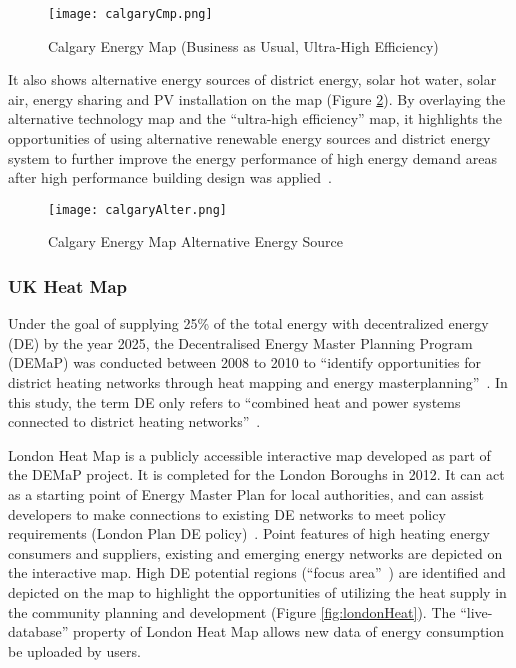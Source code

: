 \documentclass[hidelinks,12pt]{article}
\newcommand{\fref}[1]{Figure \ref{#1}}
\begin{document}
\begin{figure}[h!]
  \centering
  \texttt{[image: calgaryCmp.png]}
  \caption{Calgary Energy Map (Business as Usual, Ultra-High
    Efficiency)~\cite{aacip2009}}
  \label{fig:calgaryCmp}
\end{figure}

It also shows alternative energy sources of district energy, solar hot
water, solar air, energy sharing and PV installation on the map
(\fref{fig:calgaryAlter}). By overlaying the alternative technology
map and the ``ultra-high efficiency'' map, it highlights the
opportunities of using alternative renewable energy sources and
district energy system to further improve the energy performance of
high energy demand areas after high performance building design was
applied~\cite{aacip2009}.

\begin{figure}[h!]
  \centering
  \texttt{[image: calgaryAlter.png]}
  \caption{Calgary Energy Map Alternative Energy Source~\cite{aacip2009}}
  \label{fig:calgaryAlter}
\end{figure}

\subsubsection{UK Heat Map}
Under the goal of supplying 25\% of the total energy with
decentralized energy (DE) by the year 2025, the Decentralised Energy
Master Planning Program (DEMaP) was conducted between 2008 to 2010 to
``identify opportunities for district heating networks through heat
mapping and energy masterplanning''~\cite{londonHeatMap}. In this
study, the term DE only refers to ``combined heat and power systems
connected to district heating
networks''~\cite{decentralHeatMap2011}. 

London Heat Map is a publicly accessible interactive map developed as
part of the DEMaP project. It is completed for the London Boroughs in
2012. It can act as a starting point of Energy Master Plan for local
authorities, and can assist developers to make connections to existing
DE networks to meet policy requirements (London Plan DE
policy)~\cite{decentralHeatMap2011, londonHeatMap}. Point features of
high heating energy consumers and suppliers, existing and emerging
energy networks are depicted on the interactive map. High DE potential
regions (``focus area''~\cite{decentralHeatMap2011}) are identified
and depicted on the map to highlight the opportunities of utilizing
the heat supply in the community planning and development
(\fref{fig:londonHeat}). The ``live-database'' property of London Heat
Map allows new data of energy consumption be uploaded by users.
\end{document}
